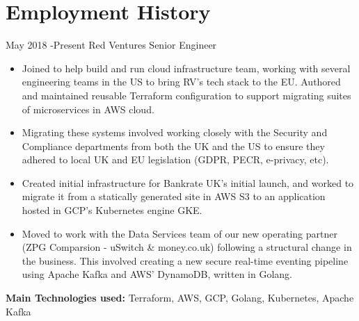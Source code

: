 \documentclass[10pt]{article} %
\begin{document}
\section{Employment History}

\jobheader
{May 2018 -}{Present}
{Red Ventures}
{Senior Engineer}
\vspace{-1cm}
  \begin{itemize}

  \item Joined to help build and run cloud infrastructure team, working
        with several engineering teams in the US to bring RV's tech stack to the EU.
        Authored and maintained reusable Terraform configuration to support migrating
        suites of microservices in AWS cloud.

  \item Migrating these systems involved working closely with the Security
        and Compliance departments from both the UK and the US to ensure they
        adhered to local UK and EU legislation (GDPR, PECR, e-privacy, etc).

  \item Created initial infrastructure for Bankrate UK's initial launch, and worked
        to migrate it from a statically generated site in AWS S3 to an application hosted
        in GCP's Kubernetes engine GKE.

  \item Moved to work with the Data Services team of our new operating partner
        (ZPG Comparsion - uSwitch \& money.co.uk) following a structural change
        in the business. This involved creating a new secure real-time eventing
        pipeline using Apache Kafka and AWS' DynamoDB, written in Golang.

  \end{itemize}

  \textbf{Main Technologies used:}
  Terraform, AWS, GCP, Golang, Kubernetes, Apache Kafka
\end{document}
